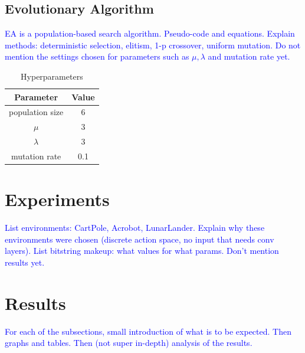\documentclass{article}
\newcommand{\TODO}[1]{\textcolor{blue}{#1}}
\begin{document}
\subsection{Evolutionary Algorithm}

\TODO{
    EA is a population-based search algorithm.
    Pseudo-code and equations.
    Explain methods: deterministic selection, elitism, 1-p crossover, uniform mutation.
    Do not mention the settings chosen for parameters such as $\mu, \lambda$ and mutation rate yet.
}

\begin{table}[htbp]
    \centering
    \begin{tabular}
        {|c|c|}
        \toprule
        \textbf{Parameter} & \textbf{Value} \\
        \midrule
        population size & 6 \\
        $\mu$           & 3 \\
        $\lambda$       & 3 \\
        mutation rate   & 0.1 \\
        \bottomrule
    \end{tabular}
    \caption{Hyperparameters}
    \label{tab:hyper}
\end{table}

\section{Experiments}
\label{sec:exp}

\TODO{
    List environments: CartPole, Acrobot, LunarLander.
    Explain why these environments were chosen (discrete action space, no input that needs conv layers).
    List bitstring makeup: what values for what params.
    Don't mention results yet.
}

\section{Results}
\label{sec:res}

\TODO{
    For each of the subsections, small introduction of what is to be expected.
    Then graphs and tables.
    Then (not super in-depth) analysis of the results.
}
\end{document}
